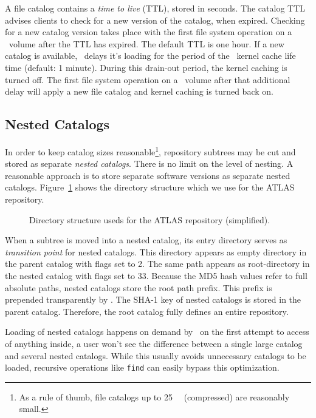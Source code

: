 A file catalog contains a \emph{time to live} (TTL), stored in seconds.
The catalog TTL advises clients to check for a new version of the catalog, when expired.
Checking for a new catalog version takes place with the first file system operation on a \cvmfs\ volume after the TTL has expired.
The default TTL is one hour.
If a new catalog is available, \cvmfs\ delays it's loading for the period of the \cvmfs\ kernel cache life time (default: 1 minute).
During this drain-out period, the kernel caching is turned off.
The first file system operation on a \cvmfs\ volume after that additional delay will apply a new file catalog and kernel caching is turned back on.

\subsection{Nested Catalogs}
In order to keep catalog sizes reasonable\footnote{As a rule of thumb, file catalogs up to \SI{25}{\mega\byte} (compressed) are reasonably small.}, repository subtrees may be cut and stored as separate \emph{nested catalogs}.
There is no limit on the level of nesting.
A reasonable approach is to store separate software versions as separate nested catalogs.
Figure~\ref{fig:nested} shows the directory structure which we use for the ATLAS repository.
\begin{figure}
	\begin{center}
		\framebox{}
	\end{center}
	\caption{Directory structure useds for the ATLAS repository (simplified).}
	\label{fig:nested}
\end{figure}

When a subtree is moved into a nested catalog, its entry directory serves as \emph{transition point} for nested catalogs.
This directory appears as empty directory in the parent catalog with flags set to 2.
The same path appears as root-directory in the nested catalog with flags set to 33.
Because the MD5 hash values refer to full absolute paths, nested catalogs store the root path prefix.
This prefix is prepended transparently by \cvmfs.
The SHA-1 key of nested catalogs is stored in the parent catalog.
Therefore, the root catalog fully defines an entire repository.

Loading of nested catalogs happens on demand by \cvmfs\ on the first attempt to access of anything inside, \ie a user won't see the difference between a single large catalog and several nested catalogs.
While this usually avoids unnecessary catalogs to be loaded, recursive operations like \texttt{find} can easily bypass this optimization.

